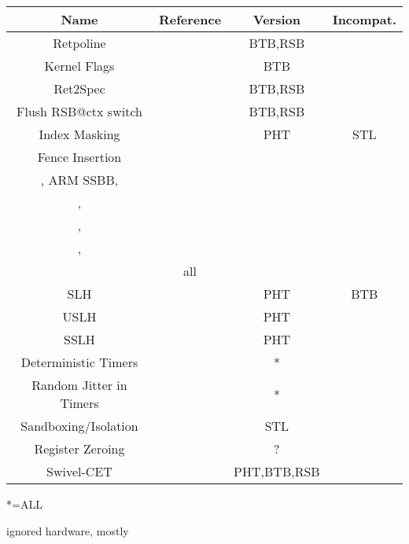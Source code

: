 \documentclass[12pt]{article}
\begin{document}
\begin{center}
  \begin{tabular}{|c|c|c|c|}
    \hline
    Name      & 
    Reference        &
    Version &
    Incompat.
    \\
    \hline
    Retpoline & 
    \cite{retpoline,gretpoline} &
    BTB,RSB &
    \\
    Kernel Flags & 
    \cite{ipredd} &
    BTB &
    \\
    Ret2Spec &
    \cite{maisuradze2018ret2spec} &
    BTB,RSB &
    \\
    Flush RSB@ctx switch &
    \cite{maisuradze2018ret2spec} &
    BTB,RSB &
    \\
    Index Masking &
    \cite{Daniel2021HuntingTH} &
    PHT &
    STL
    \\
    Fence Insertion &
    \makecell{
      \cite{Daniel2021HuntingTH}, \\
      \cite{ssbd}, ARM SSBB,\\
      \cite{vassena2021blade}, \\
      \cite{maisuradze2018ret2spec}, \\
      \cite{bhattacharyya2019smotherspectre}, \\
      \cite{mosier2023serberus}
    } &
    all &
    \\
    SLH &
    \cite{slh} &
    PHT &
    BTB \\
    USLH &
    \cite{zhang2023uslh} &
    PHT &
    \\
    SSLH &
    \cite{patrignani2021exorcising} &
    PHT &
    \\
    Deterministic Timers &
    \cite{cao2017detbrowser} &
    * & 
    \\
    Random Jitter in Timers &
    \cite{kohlbrenner2016fuzzyfox} &
    * & 
    \\
    Sandboxing/Isolation &
    \cite{isolation,mosier2023serberus} &
    STL & 
    \\
    Register Zeroing &
    \cite{mosier2023serberus} &
    ? & 
    \\
    Swivel-CET &
    \cite{narayan2021swivel} &
    PHT,BTB,RSB &
    \\
    \hline
  \end{tabular}
\end{center}
*=ALL

ignored hardware, mostly

\clearpage



\printglossary
\end{document}
